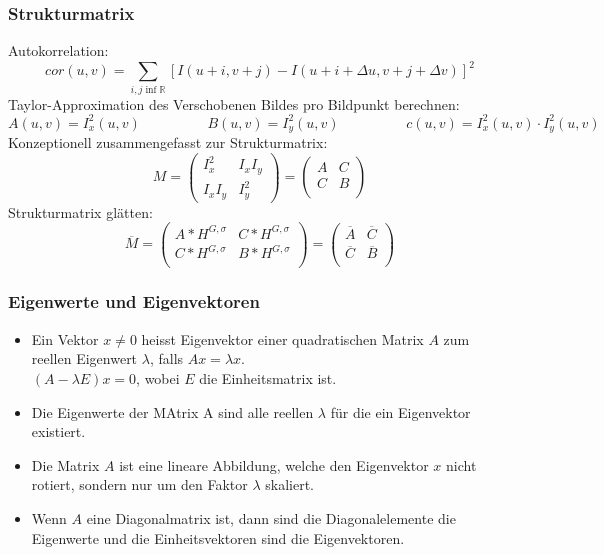 \documentclass[10pt]{article}
\newcommand{\RN}{\mathbb{R}} %
\begin{document}
\subsubsection{Strukturmatrix}
Autokorrelation:
\begin{equation*}
	cor(u,v) = \sum_{i,j \inf \RN} [ I(u+i,v+j) - I(u+i + \Delta u, v + j + \Delta v)]^2
\end{equation*}
Taylor-Approximation des Verschobenen Bildes pro Bildpunkt berechnen:
\begin{equation*}
	A(u,v)=I^2_x(u,v)
	\hspace{2cm} 
	B(u,v)=I^2_y(u,v)
	\hspace{2cm}
	c(u,v)= I^2_x(u,v) \cdot I^2_y(u,v)
\end{equation*}
Konzeptionell zusammengefasst zur Strukturmatrix:
\begin{equation*}
	M = \begin{pmatrix}
	I^2_x & I_xI_y \\
	I_xI_y & I^2_y
	\end{pmatrix} = \begin{pmatrix}
	A & C \\
	C & B \\
	\end{pmatrix}
\end{equation*}
Strukturmatrix glätten:
\begin{equation*}
	\overline{M} = \begin{pmatrix}
	A*H^{G,\sigma} & C*H^{G,\sigma} \\
	C*H^{G,\sigma} & B*H^{G,\sigma} \\
	\end{pmatrix}= \begin{pmatrix}
	\overline{A} & \overline{C} \\
	\overline{C} & \overline{B} \\
	\end{pmatrix}
\end{equation*}
\subsubsection{Eigenwerte und Eigenvektoren}
\begin{itemize}
	\item Ein Vektor $x \neq 0$ heisst Eigenvektor einer quadratischen Matrix $A$ zum reellen Eigenwert $\lambda$, falls $Ax=\lambda x$. \\
		$(A - \lambda E)x=0$, wobei $E$ die Einheitsmatrix ist.
	\item Die Eigenwerte der MAtrix A sind alle reellen $\lambda$ für die ein Eigenvektor existiert.
	\item Die Matrix $A$ ist eine lineare Abbildung, welche den Eigenvektor $x$ nicht rotiert, sondern nur um den Faktor $\lambda$ skaliert.
	\item Wenn $A$ eine Diagonalmatrix ist, dann sind die Diagonalelemente die Eigenwerte und die Einheitsvektoren sind die Eigenvektoren.
\end{itemize}
\end{document}
